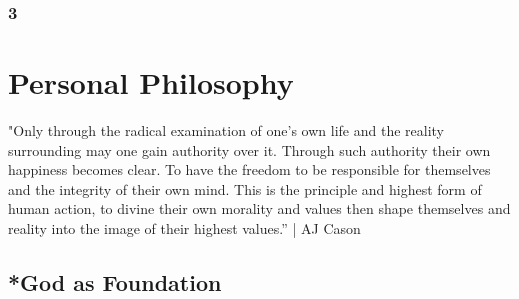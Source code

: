 \subsection{3}

\chapter{Personal Philosophy}
"Only through the radical examination of one's own life and the reality surrounding may one gain authority over it. Through such authority their own happiness becomes clear. To have the freedom to be responsible for themselves and the integrity of their own mind. This is the principle and highest form of human action, to divine their own morality and values then shape themselves and reality into the image of their highest values.” | AJ Cason
\section{*God as Foundation}
